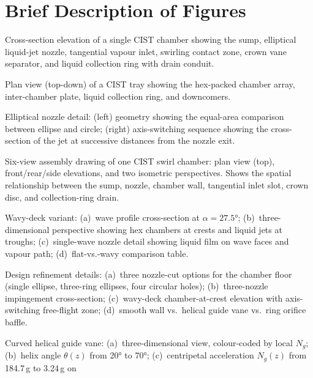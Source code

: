 \documentclass[11pt,letterpaper]{article}
\begin{document}
\section{Brief Description of Figures}

\begin{description}[nosep]
  \item[Figure~\ref{fig:elevation}] Cross-section elevation of a single CIST
    chamber showing the sump, elliptical liquid-jet nozzle, tangential vapour
    inlet, swirling contact zone, crown vane separator, and liquid collection
    ring with drain conduit.
  \item[Figure~\ref{fig:plan}] Plan view (top-down) of a CIST tray showing
    the hex-packed chamber array, inter-chamber plate, liquid collection ring,
    and downcomers.
  \item[Figure~\ref{fig:nozzle}] Elliptical nozzle detail: (left) geometry
    showing the equal-area comparison between ellipse and circle; (right)
    axis-switching sequence showing the cross-section of the jet at
    successive distances from the nozzle exit.
  \item[Figure~\ref{fig:multiview}] Six-view assembly drawing of one CIST
    swirl chamber: plan view (top), front/rear/side elevations, and two
    isometric perspectives.  Shows the spatial relationship between the
    sump, nozzle, chamber wall, tangential inlet slot, crown disc, and
    collection-ring drain.
  \item[Figure~\ref{fig:wavy}] Wavy-deck variant: (a)~wave profile
    cross-section at $\alpha = 27.5°$; (b)~three-dimensional perspective
    showing hex chambers at crests and liquid jets at troughs;
    (c)~single-wave nozzle detail showing liquid film on wave faces and
    vapour path; (d)~flat-vs.-wavy comparison table.
  \item[Figure~\ref{fig:details}] Design refinement details:
    (a)~three nozzle-cut options for the chamber floor (single ellipse,
    three-ring ellipses, four circular holes); (b)~three-nozzle
    impingement cross-section; (c)~wavy-deck chamber-at-crest elevation
    with axis-switching free-flight zone; (d)~smooth wall vs.\ helical
    guide vane vs.\ ring orifice baffle.
  \item[Figure~\ref{fig:curved_vane}] Curved helical guide vane:
    (a)~three-dimensional view, colour-coded by local $N_g$;
    (b)~helix angle $\theta(z)$ from 20° to 70°;
    (c)~centripetal acceleration $N_g(z)$ from 184.7\,g to 3.24\,g on

\end{description}
\end{document}
